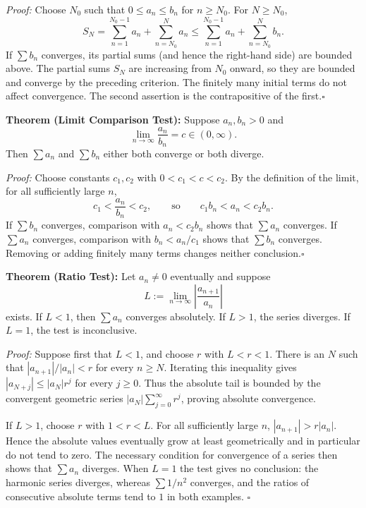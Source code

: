 \documentclass[a4paper,11pt,abstracton]{scrartcl}
\theoremstyle{dotlessP}
\theoremstyle{dotlessS}
\theoremstyle{remark}
\theoremstyle{definition}
\begin{document}
\begin{claim_box}
\textit{Proof:} Choose $N_0$ such that $0\le a_n\le b_n$ for
$n\ge N_0$. For $N\ge N_0$,
\[
    S_N=\sum_{n=1}^{N_0-1}a_n+\sum_{n=N_0}^N a_n
    \le \sum_{n=1}^{N_0-1}a_n+\sum_{n=N_0}^N b_n.
\]
If $\sum b_n$ converges, its partial sums (and hence the right-hand
side) are bounded above. The partial sums $S_N$ are increasing from
$N_0$ onward, so they are bounded and converge by the preceding
criterion. The finitely many initial terms do not affect convergence.
The second assertion is the contrapositive of the first.\hfill$\square$
\end{claim_box}

\begin{problem_box}
\textbf{Theorem (Limit Comparison Test):} Suppose $a_n,b_n>0$ and
\[
 \lim_{n\to\infty}\frac{a_n}{b_n}=c\in(0,\infty).
\]
Then $\sum a_n$ and $\sum b_n$ either both converge or both diverge.
\end{problem_box}

\begin{claim_box}
\textit{Proof:} Choose constants $c_1,c_2$ with
$0<c_1<c<c_2$. By the definition of the limit, for all sufficiently
large $n$,
\[
    c_1<\frac{a_n}{b_n}<c_2,
    \qquad\text{so}\qquad c_1b_n<a_n<c_2b_n.
\]
If $\sum b_n$ converges, comparison with $a_n<c_2b_n$ shows that
$\sum a_n$ converges. If $\sum a_n$ converges, comparison with
$b_n<a_n/c_1$ shows that $\sum b_n$ converges. Removing or adding
finitely many terms changes neither conclusion.\hfill$\square$
\end{claim_box}

\begin{problem_box}
\textbf{Theorem (Ratio Test):} Let $a_n\ne0$ eventually and suppose
\[
 L:=\lim_{n\to\infty}\left|\frac{a_{n+1}}{a_n}\right|
\]
exists. If $L<1$, then $\sum a_n$ converges absolutely. If $L>1$,
the series diverges. If $L=1$, the test is inconclusive.
\end{problem_box}

\begin{claim_box}
\textit{Proof:} Suppose first that $L<1$, and choose $r$ with
$L<r<1$. There is an $N$ such that
$|a_{n+1}|/|a_n|<r$ for every $n\ge N$. Iterating this inequality
gives $|a_{N+j}|\le |a_N|r^j$ for every $j\ge0$. Thus the absolute
tail is bounded by the convergent geometric series
$|a_N|\sum_{j=0}^{\infty}r^j$, proving absolute convergence.

If $L>1$, choose $r$ with $1<r<L$. For all sufficiently large $n$,
$|a_{n+1}|>r|a_n|$. Hence the absolute values eventually grow at
least geometrically and in particular do not tend to zero. The
necessary condition for convergence of a series then shows that
$\sum a_n$ diverges. When $L=1$ the test gives no conclusion: the
harmonic series diverges, whereas $\sum 1/n^2$ converges, and the
ratios of consecutive absolute terms tend to $1$ in both examples.
\hfill$\square$
\end{claim_box}
\end{document}
